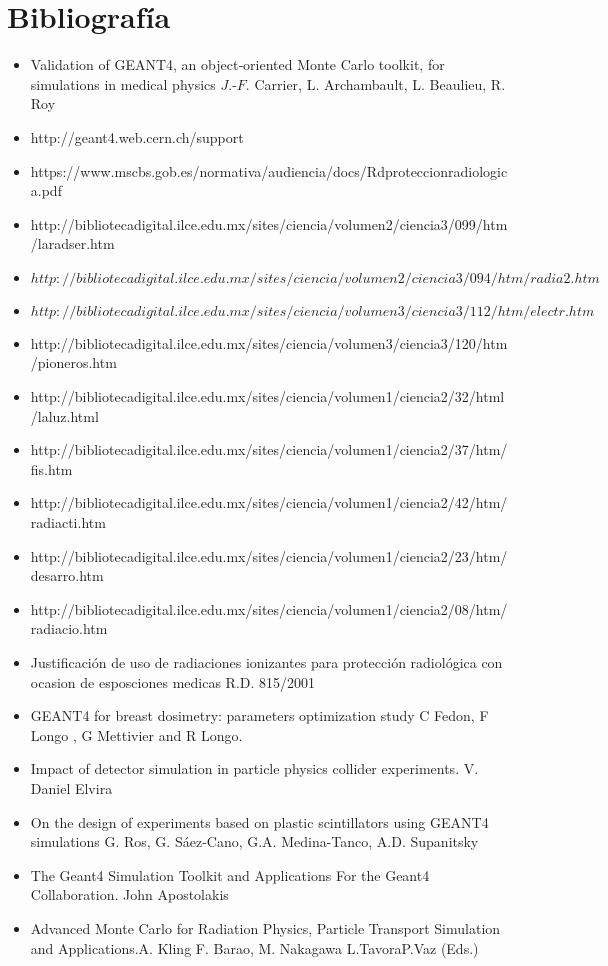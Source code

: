 \documentclass[a4paper,10pt]{article}
\begin{document}
\section{Bibliografía}
\begin{itemize}

\item Validation of GEANT4, an object‐oriented Monte Carlo toolkit, for simulations in medical physics
$J.‐F.$ Carrier, L. Archambault, L. Beaulieu, R. Roy
\item http://geant4.web.cern.ch/support
\item https://www.mscbs.gob.es/normativa/audiencia/docs/Rdproteccionradiologica.pdf
\item http://bibliotecadigital.ilce.edu.mx/sites/ciencia/volumen2/ciencia3/099/htm/laradser.htm
\item $http://bibliotecadigital.ilce.edu.mx/sites/ciencia/volumen2/ciencia3/094/htm/radia2.htm$
\item $http://bibliotecadigital.ilce.edu.mx/sites/ciencia/volumen3/ciencia3/112/htm/electr.htm$
\item http://bibliotecadigital.ilce.edu.mx/sites/ciencia/volumen3/ciencia3/120/htm/pioneros.htm
\item http://bibliotecadigital.ilce.edu.mx/sites/ciencia/volumen1/ciencia2/32/html/laluz.html
\item http://bibliotecadigital.ilce.edu.mx/sites/ciencia/volumen1/ciencia2/37/htm/fis.htm
\item http://bibliotecadigital.ilce.edu.mx/sites/ciencia/volumen1/ciencia2/42/htm/radiacti.htm
\item http://bibliotecadigital.ilce.edu.mx/sites/ciencia/volumen1/ciencia2/23/htm/desarro.htm
\item http://bibliotecadigital.ilce.edu.mx/sites/ciencia/volumen1/ciencia2/08/htm/radiacio.htm
\item Justificación de uso de radiaciones ionizantes para protección radiológica con ocasion de esposciones medicas R.D. 815/2001
\item GEANT4 for breast dosimetry: parameters optimization study C Fedon, F Longo , G Mettivier  and R Longo.
\item Impact of detector simulation in particle physics collider
experiments. V. Daniel Elvira

\item On the design of experiments based on plastic scintillators using GEANT4
simulations G. Ros, G. Sáez-Cano, G.A. Medina-Tanco, A.D. Supanitsky
\item The Geant4 Simulation Toolkit and Applications For the Geant4 Collaboration. John Apostolakis
\item Advanced Monte Carlo for Radiation Physics, Particle Transport Simulation and Applications.A. Kling F. Barao, M. Nakagawa L.TavoraP.Vaz (Eds.)


\end{itemize}
\end{document}
